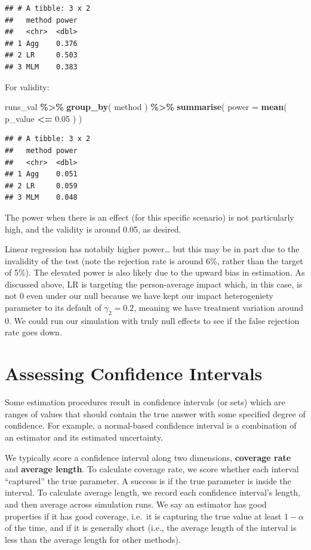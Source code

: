 \documentclass[
]{book}
\newenvironment{Shaded}{\begin{snugshade}}{\end{snugshade}}
\newcommand{\AttributeTok}[1]{\textcolor[rgb]{0.13,0.29,0.53}{#1}}
\newcommand{\FloatTok}[1]{\textcolor[rgb]{0.00,0.00,0.81}{#1}}
\newcommand{\FunctionTok}[1]{\textcolor[rgb]{0.13,0.29,0.53}{\textbf{#1}}}
\newcommand{\NormalTok}[1]{#1}
\newcommand{\SpecialCharTok}[1]{\textcolor[rgb]{0.81,0.36,0.00}{\textbf{#1}}}
\begin{document}
\begin{verbatim}
## # A tibble: 3 x 2
##   method power
##   <chr>  <dbl>
## 1 Agg    0.376
## 2 LR     0.503
## 3 MLM    0.383
\end{verbatim}

For validity:

\begin{Shaded}
\begin{Highlighting}[]
\NormalTok{runs\_val }\SpecialCharTok{\%\textgreater{}\%} \FunctionTok{group\_by}\NormalTok{( method ) }\SpecialCharTok{\%\textgreater{}\%}
  \FunctionTok{summarise}\NormalTok{( }\AttributeTok{power =} \FunctionTok{mean}\NormalTok{( p\_value }\SpecialCharTok{\textless{}=} \FloatTok{0.05}\NormalTok{ ) )}
\end{Highlighting}
\end{Shaded}

\begin{verbatim}
## # A tibble: 3 x 2
##   method power
##   <chr>  <dbl>
## 1 Agg    0.051
## 2 LR     0.059
## 3 MLM    0.048
\end{verbatim}

The power when there is an effect (for this specific scenario) is not particularly high, and the validity is around 0.05, as desired.

Linear regression has notabily higher power\ldots{} but this may be in part due to the invalidity of the test (note the rejection rate is around 6\%, rather than the target of 5\%).
The elevated power is also likely due to the upward bias in estimation.
As discussed above, LR is targeting the person-average impact which, in this case, is not 0 even under our null because we have kept our impact heterogeniety parameter to its default of \(\gamma_2=0.2\), meaning we have treatment variation around 0.
We could run our simulation with truly null effects to see if the false rejection rate goes down.

\section{Assessing Confidence Intervals}\label{assessing-confidence-intervals}

Some estimation procedures result in confidence intervals (or sets) which are ranges of values that should contain the true answer with some specified degree of confidence.
For example, a normal-based confidence interval is a combination of an estimator and its estimated uncertainty.

We typically score a confidence interval along two dimensions, \textbf{coverage rate} and \textbf{average length}.
To calculate coverage rate, we score whether each interval ``captured'' the true parameter.
A success is if the true parameter is inside the interval.
To calculate average length, we record each confidence interval's length, and then average across simulation runs.
We say an estimator has good properties if it has good coverage, i.e.~it is capturing the true value at least \(1-\alpha\) of the time, and if it is generally short (i.e., the average length of the interval is less than the average length for other methods).
\end{document}
